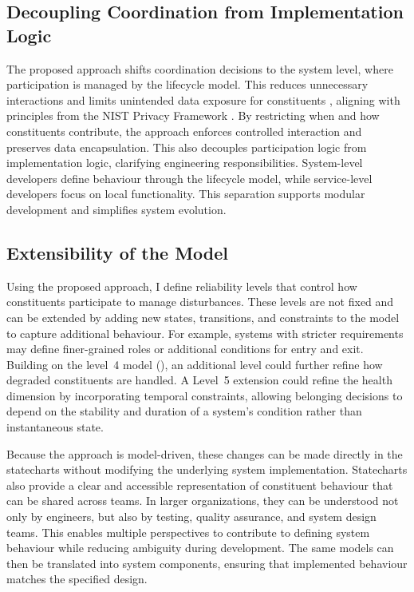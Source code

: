 \subsection{Decoupling Coordination from Implementation Logic}
The proposed approach shifts coordination decisions to the system level, where participation is managed by the lifecycle model. This reduces unnecessary interactions and limits unintended data exposure for constituents \cite{olivero2024systematic}, aligning with principles from the NIST Privacy Framework \cite{enterprise2020nist}. By restricting when and how constituents contribute, the approach enforces controlled interaction and preserves data encapsulation. This also decouples participation logic from implementation logic, clarifying engineering responsibilities. System-level developers define behaviour through the lifecycle model, while service-level developers focus on local functionality. This separation supports modular development and simplifies system evolution.

\subsection{Extensibility of the Model}
Using the proposed approach, I define reliability levels that control how constituents participate to manage disturbances. These levels are not fixed and can be extended by adding new states, transitions, and constraints to the model to capture additional behaviour. For example, systems with stricter requirements may define finer-grained roles or additional conditions for entry and exit. Building on the level~4 model (), an additional level could further refine how degraded constituents are handled. A Level~5 extension could refine the health dimension by incorporating temporal constraints, allowing belonging decisions to depend on the stability and duration of a system's condition rather than instantaneous state.

Because the approach is model-driven, these changes can be made directly in the statecharts without modifying the underlying system implementation. Statecharts also provide a clear and accessible representation of constituent behaviour that can be shared across teams. In larger organizations, they can be understood not only by engineers, but also by testing, quality assurance, and system design teams. This enables multiple perspectives to contribute to defining system behaviour while reducing ambiguity during development. The same models can then be translated into system components, ensuring that implemented behaviour matches the specified design.


